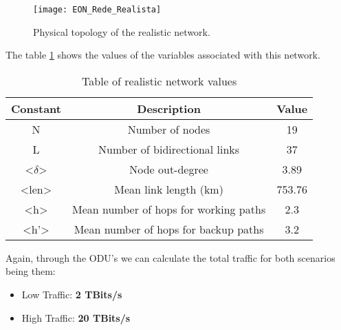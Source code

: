 \begin{figure}[h!]
\centering
\texttt{[image: EON\_Rede\_Realista]}
\caption{Physical topology of the realistic network.}
\end{figure}

The table \ref{table:2} shows the values of the variables associated with this network.
\begin{table}[h!]
\centering
\begin{tabular}{|| c | c | c||}
 \hline
 Constant & Description & Value \\
 \hline\hline
 N & Number of nodes & 19 \\
 L & Number of bidirectional links & 37 \\
 <$\delta$> & Node out-degree & 3.89 \\
 <len> & Mean link length (km) & 753.76 \\
 <h> & Mean number of hops for working paths & 2.3 \\
 <h'> & Mean number of hops for backup paths & 3.2 \\
 \hline
\end{tabular}
\caption{Table of realistic network values}
\label{table:2}
\end{table}

Again, through the ODU's we can calculate the total traffic for both scenarios being them:
\begin{itemize}
  \item Low Traffic: \textbf{2 TBits/s}
  \item High Traffic: \textbf{20 TBits/s}
\end{itemize}

